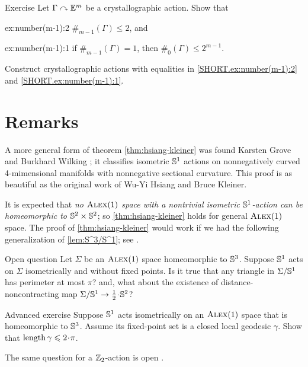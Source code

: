 \begin{thm}{Exercise}\label{ex:number(m-1)}
Let $\Gamma\curvearrowright \mathbb{E}^m$ be a crystallographic action.
Show that
\begin{subthm}{ex:number(m-1):2}
$\#_{m-1}(\Gamma)\le 2$, and
\end{subthm}

\begin{subthm}{ex:number(m-1):1}
if $\#_{m-1}(\Gamma)=1$, then $\#_0(\Gamma)\le 2^{m-1}$.
\end{subthm}

Construct  crystallographic actions with equalities in \ref{SHORT.ex:number(m-1):2} and \ref{SHORT.ex:number(m-1):1}.
\end{thm}

\section{Remarks}

A more general form of theorem \ref{thm:hsiang-kleiner} was found Karsten Grove and Burkhard Wilking \cite{grove-wilking};
it classifies isometric $\mathbb{S}^1$ actions on nonnegatively curved 4-mimensional manifolds with nonnegative sectional curvature.
This proof is as beautiful as the original work of Wu-Yi Hsiang and Bruce Kleiner.

It is expected that \textit{no $\textsc{Alex}(1)$ space with a nontrivial isometric $\mathbb{S}^1$-action can be homeomorphic to $\mathbb{S}^2\times\mathbb{S}^2$};
so \ref{thm:hsiang-kleiner} holds for general $\textsc{Alex}(1)$ space.
The proof of \ref{thm:hsiang-kleiner} would work if we had the following generalization of \ref{lem:S^3/S^1};
see \cite{harvey-searle}.

\begin{thm}{Open question}
Let $\Sigma$ be an $\textsc{Alex}(1)$ space homeomorphic to $\mathbb{S}^3$.
Suppose $\mathbb{S}^1$ acts on $\Sigma$ isometrically and without fixed points.
Is it true that any triangle in $\Sigma/\mathbb{S}^1$ has perimeter at most $\pi$?
and, what about the existence of distance-noncontracting map $\Sigma/\SSS^1\to \tfrac12\cdot\SSS^2$?
\end{thm}


\begin{thm}{Advanced exercise}\label{ex:S1actsS3}
Suppose $\mathbb{S}^1$ acts isometrically on an $\textsc{Alex}(1)$ space that is homeomorphic to $\mathbb{S}^3$.
Assume its fixed-point set is a closed local geodesic $\gamma$.
Show that $\length\gamma\le2\cdot\pi$.
\end{thm}

The same question for a $\mathbb{Z}_2$-action is open \cite{petrunin-involution}.

